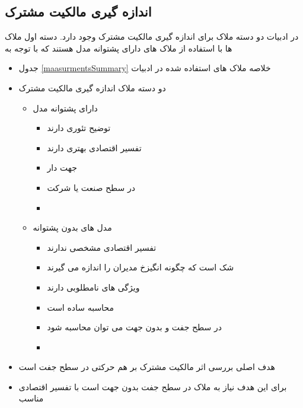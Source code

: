 \subsection{اندازه گیری مالکیت مشترک}
در ادبیات دو دسته ملاک برای اندازه گیری مالکیت مشترک وجود دارد. دسته اول ملاک ها با استفاده از ملاک های دارای پشتوانه مدل هستند که با توجه به 
\begin{itemize}
	\item 
	جدول 
	\ref{maasurmentsSummary}
	خلاصه ملاک های استفاده شده در ادبیات
	\item 
	دو دسته ملاک اندازه گیری مالکیت مشترک
	\begin{itemize}
		\item 
		دارای پشتوانه مدل
		\begin{itemize}
			\item 
			توضیح تئوری دارند
			\item 
			تفسیر اقتصادی بهتری دارند
			\item 
			جهت دار
			\item
			در سطح صنعت یا شرکت
			\item
		\end{itemize}
		\item 
	مدل های بدون پشتوانه
	\begin{itemize}
		\item 
		تفسیر اقتصادی مشخصی ندارند
		\item 
		شک است که چگونه انگیزخ مدیران را اندازه می گیرند
		\item 
		ویژگی های نامطلوبی دارند 
		\item
		محاسبه ساده است
		\item
		در سطح جفت و بدون جهت می توان محاسبه شود
		
		\item
	\end{itemize}
	
		
	\end{itemize}
	
	\item 
	هدف اصلی بررسی اثر مالکیت مشترک بر هم حرکتی در سطح جفت است
	
	\item 
	برای این هدف نیاز به ملاک در سطح جفت بدون جهت است با تفسیر اقتصادی مناسب
	

\end{itemize}
